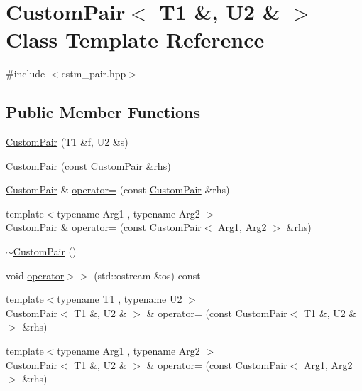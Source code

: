 \hypertarget{classCustomPair_3_01T1_01_6_00_01U2_01_6_01_4}{}\section{Custom\+Pair$<$ T1 \&, U2 \& $>$ Class Template Reference}
\label{classCustomPair_3_01T1_01_6_00_01U2_01_6_01_4}


{\ttfamily \#include $<$cstm\+\_\+pair.\+hpp$>$}

\subsection*{Public Member Functions}
\begin{DoxyCompactItemize}
\item 
\hyperlink{classCustomPair_3_01T1_01_6_00_01U2_01_6_01_4_aaaf3b02f438e152c38c3e162d135729a}{Custom\+Pair} (T1 \&f, U2 \&s)
\item 
\hyperlink{classCustomPair_3_01T1_01_6_00_01U2_01_6_01_4_afa34ee1c426f70d7dd7be9af09433afe}{Custom\+Pair} (const \hyperlink{classCustomPair}{Custom\+Pair} \&rhs)
\item 
\hyperlink{classCustomPair}{Custom\+Pair} \& \hyperlink{classCustomPair_3_01T1_01_6_00_01U2_01_6_01_4_a252bb937d261f8975fab5c6841203bdf}{operator=} (const \hyperlink{classCustomPair}{Custom\+Pair} \&rhs)
\item 
{\footnotesize template$<$typename Arg1 , typename Arg2 $>$ }\\\hyperlink{classCustomPair}{Custom\+Pair} \& \hyperlink{classCustomPair_3_01T1_01_6_00_01U2_01_6_01_4_acdfa819a4ec0300be201a099ecd4f22b}{operator=} (const \hyperlink{classCustomPair}{Custom\+Pair}$<$ Arg1, Arg2 $>$ \&rhs)
\item 
\hyperlink{classCustomPair_3_01T1_01_6_00_01U2_01_6_01_4_a4c5e1ae9340d0d69527d4e1d838fb0c4}{$\sim$\+Custom\+Pair} ()
\item 
void \hyperlink{classCustomPair_3_01T1_01_6_00_01U2_01_6_01_4_a3603019f947409a307a07439b6df73eb}{operator$>$$>$} (std\+::ostream \&os) const 
\item 
{\footnotesize template$<$typename T1 , typename U2 $>$ }\\\hyperlink{classCustomPair}{Custom\+Pair}$<$ T1 \&, U2 \& $>$ \& \hyperlink{classCustomPair_3_01T1_01_6_00_01U2_01_6_01_4_ab92e107cfaac44641fe43ede8b971e11}{operator=} (const \hyperlink{classCustomPair}{Custom\+Pair}$<$ T1 \&, U2 \& $>$ \&rhs)
\item 
{\footnotesize template$<$typename Arg1 , typename Arg2 $>$ }\\\hyperlink{classCustomPair}{Custom\+Pair}$<$ T1 \&, U2 \& $>$ \& \hyperlink{classCustomPair_3_01T1_01_6_00_01U2_01_6_01_4_a49ce7ba671e2223c18fbfb154b350649}{operator=} (const \hyperlink{classCustomPair}{Custom\+Pair}$<$ Arg1, Arg2 $>$ \&rhs)
\end{DoxyCompactItemize}


